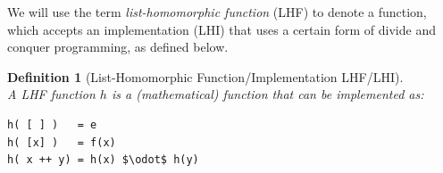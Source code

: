 \documentclass[acmsmall,review]{acmart}\settopmatter{printfolios=true,printccs=false,printacmref=false}
\newtheorem{mydef}{Definition}
\begin{document}
We will use the term \emph{list-homomorphic function} (LHF)
to denote a function, which accepts an implementation (LHI)
that uses a certain form of divide and conquer programming, 
as defined below.
 
\begin{mydef}[List-Homomorphic Function/Implementation LHF/LHI]\label{LH-FI-Def}
$\mbox{ }$\\
A LHF function $h$ is a (mathematical) function that can be implemented as: 
\begin{lstlisting}[mathescape=true]
h( [ ] )   = e
h( [x] )   = f(x)
h( x ++ y) = h(x) $\odot$ h(y)
\end{lstlisting}
\end{mydef}\vspace{-2ex}
\end{document}
